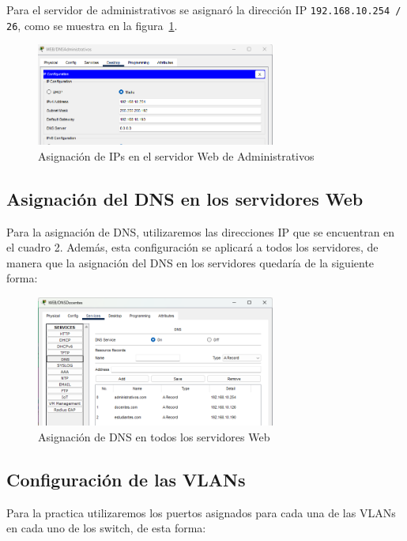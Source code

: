     Para el servidor de administrativos se asignaró la dirección IP \texttt{192.168.10.254 / 26}, como se muestra en la figura~\ref{fig:serAd_IP}.

    \begin{figure}[H]
        \centering
        \includegraphics[width=0.7\textwidth]{img/serveradmin.png}
        \caption{Asignación de IPs en el servidor Web de Administrativos}
        \label{fig:serAd_IP}
    \end{figure}

    \subsection*{Asignación del DNS en los servidores Web}
    Para la asignación de DNS, utilizaremos las direcciones IP que se encuentran en el cuadro 2. Además, esta configuración se aplicará a todos los servidores, de manera que la asignación del DNS en los servidores quedaría de la siguiente forma:
    
    \begin{figure}[H]
        \centering
        \includegraphics[width=0.7\textwidth]{img/dns.png}
        \caption{Asignación de DNS en todos los servidores Web}
        \label{fig:dns}
    \end{figure}

    \subsection*{Configuración de las VLANs}
    Para la practica utilizaremos los puertos asignados para cada una de las VLANs en cada uno de los switch, de esta forma:
    
